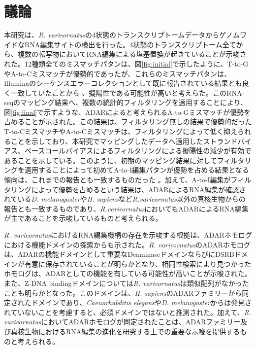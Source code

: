\section{議論}
本研究は、{\it R. varieornatus}の4状態のトランスクリプトームデータからゲノムワイドなRNA編集サイトの検出を行った。4状態のトランスクリプトーム全てから、複数の転写物においてRNA編集による塩基置換が起きていることが示唆された。12種類全てのミスマッチパタンは、図\ref{fig:initial}で示したように、T-to-GやA-to-Cミスマッチが優勢的であったが、これらのミスマッチパタンは、Illuminaのシーケンスエラーコレクションとして既に報告されている結果とも良く一致していたことから \citep{NakOshMor1107, pmid22099972}、擬陽性である可能性が高いと考えらた。このRNA-seqのマッピング結果へ、複数の統計的フィルタリングを適用することにより、図\ref{fig:final}で示すような、ADARによると考えられるA-to-Gミスマッチが優勢を占めることが示された。この結果は、フィルタリング無しの結果で優勢的だったT-to-CミスマッチやA-to-Cミスマッチは、フィルタリングによって低く抑えられることを示しており、本研究でマッピングしたデータへ適用したストランドバイアス、ベースコールバイアスによるフィルタリングによる擬陽性の減少が有効であることを示している。このように、初期のマッピング結果に対してフィルタリングを適用することによって初めてA-to-I編集パタンが優勢を占める結果となる傾向は、これまでの報告とも一致するものだった \citep{pmid22499667}。加えて、A-to-I編集がフィルタリングによって優勢を占めるという結果は、ADARによるRNA編集が確認されている{\it D. melanogaster}や{\it H. sapiens}など{\it R.varieornatus}以外の真核生物からの報告とも一致するものであり、{\it R.varieornatus}においてもADARによるRNA編集が主であることを示唆しているものと考えられる。
\par
{\it R. varieornatus}におけるRNA編集機構の存在を示唆する根拠は、ADARホモログにおける機能ドメインの探索からも示された。{\it R. varieornatus}のADARホモログは、ADARの機能ドメインとして重要なDeaminaseドメインならびにDSRBドメインが有意に保存されていることが明らかとなり、相同性検索により見つかったホモログは、ADARとしての機能を有している可能性が高いことが示唆された。また、Z-DNA bindingドメインについては{\it R. varieornatus}は類似配列がなかったことも明らかとなった。このドメインは、{\it H. sapiens}のADARファミリーから同定されたドメインであり、{\it Caenorhabditis elegans}や{\it D. melanogaster}からは発見されていないことを考慮すると、必須ドメインではないと推測された。加えて、{\it R. varieornatus}においてADARホモログが同定されたことは、ADARファミリー及び真核生物におけるRNA編集の進化を研究する上での重要な示唆を提供するものと考えられる。
\par
